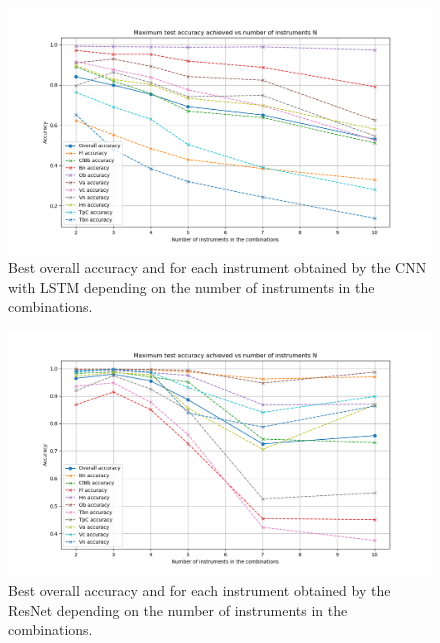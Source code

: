 \documentclass{article}
\begin{document}
\begin{figure}
\includegraphics[scale=0.6]{figs/Acc_vs_N_CNN.png}
\caption{Best overall accuracy and for each instrument obtained by the CNN with LSTM depending on the number of instruments in the combinations. \label{best_acc_cnn}}
\end{figure}

\begin{figure}
\includegraphics[scale=0.6]{figs/Acc_vs_N_ResNet.png}
\caption{Best overall accuracy and for each instrument obtained by the ResNet depending on the number of instruments in the combinations. \label{best_acc_resnet}}
\end{figure}



%
%
%
%
\end{document}
